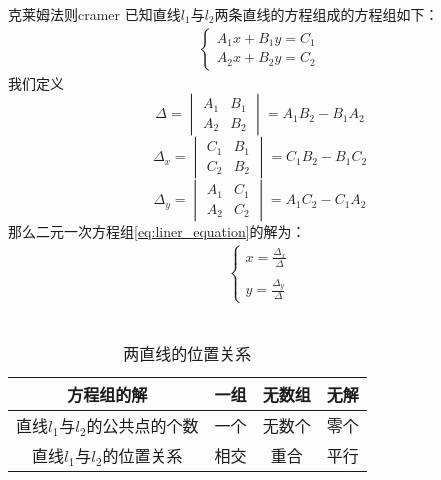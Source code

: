\begin{theorem}{克莱姆法则}{cramer}
    已知直线$l_1$与$l_2$两条直线的方程组成的方程组如下：
    \begin{eqnarray}\label{eq:liner_equation}
        \left \{
        \begin{array}{l}
            A_1 x + B_1 y = C_1\\
            A_2 x + B_2 y = C_2
        \end{array}	
        \right .
    \end{eqnarray}
    我们定义
        \begin{equation*}
            \Delta =
            \begin{vmatrix}
                A_1&B_1\\
                A_2&B_2
            \end{vmatrix}
            = A_{1}B_{2}-B_{1}A_{2}
        \end{equation*}
        \begin{equation*}
           \Delta_{x}=
           \begin{vmatrix}
               C_1&B_1\\
               C_2&B_2
           \end{vmatrix}
            = C_{1}B_{2}-B_{1}C_{2}
        \end{equation*}
        \begin{equation*}
           \Delta_{y}=
           \begin{vmatrix}
               A_1&C_1\\
               A_2&C_2
           \end{vmatrix}
            = A_{1}C_{2}-C_{1}A_{2}
        \end{equation*}
    那么二元一次方程组\ref{eq:liner_equation}的解为：
        \begin{eqnarray*}
            \left \{
            \begin{array}{l}
                \displaystyle x = \frac{\Delta_{x}}{\Delta}\\
                \\
                \displaystyle y = \frac{\Delta_{y}}{\Delta}
            \end{array}	
            \right .
        \end{eqnarray*}\\
\end{theorem}


\begin{table}[htbp]
  \caption{两直线的位置关系\label{tab:color thm}}
  \centering
  \begin{tabular}{cccc}
  \toprule
              方程组的解
              & 一组
              & 无数组
              & 无解\\
  \midrule
              直线$l_1$与$l_2$的公共点的个数
              & 一个
              & 无数个
              & 零个 \\
              直线$l_1$与$l_2$的位置关系
              & 相交
              & 重合
              & 平行 \\
  \bottomrule
  \end{tabular}
\end{table}



